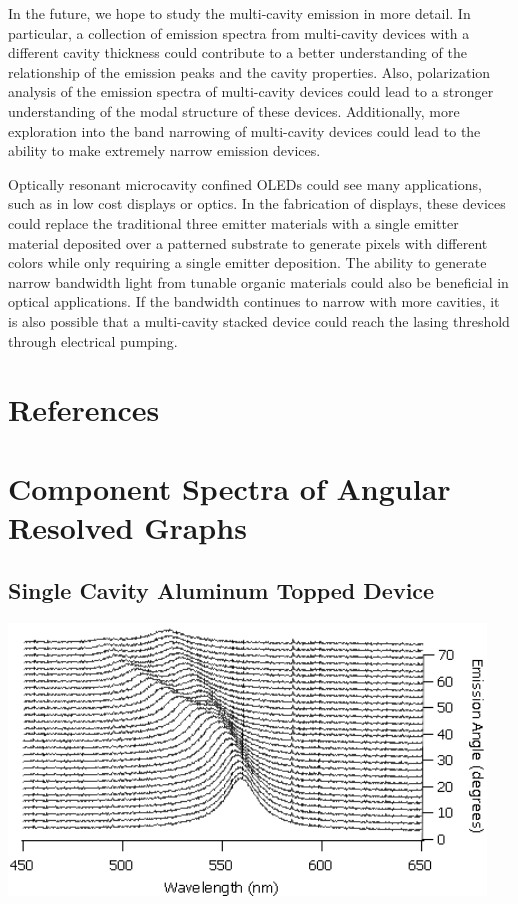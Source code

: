 \documentclass{report}
\begin{document}
    In the future, we hope to study the multi-cavity emission in more detail. In particular, a collection of emission spectra from multi-cavity devices with a different cavity thickness could contribute to a better understanding of the relationship of the emission peaks and the cavity properties. Also, polarization analysis of the emission spectra of multi-cavity devices could lead to a stronger understanding of the modal structure of these devices. Additionally, more exploration into the band narrowing of multi-cavity devices could lead to the ability to make extremely narrow emission devices.
    
    Optically resonant microcavity confined OLEDs could see many applications, such as in low cost displays or optics. In the fabrication of displays, these devices could replace the traditional three emitter materials with a single emitter material deposited over a patterned substrate to generate pixels with different colors while only requiring a single emitter deposition. The ability to generate narrow bandwidth light from tunable organic materials could also be beneficial in optical applications. If the bandwidth continues to narrow with more cavities, it is also possible that a multi-cavity stacked device could reach the lasing threshold through electrical pumping.\cite{Baldo2002,Bulovi1998} %
    
\chapter{References}
    \printbibliography[heading=none]

\appendix
\chapter{Component Spectra of Angular Resolved Graphs} \label{components}

    \section*{Single Cavity Aluminum Topped Device}
    \begin{center}
    \includegraphics[width=0.95\textwidth]{images/n1_al_top_waterfall.png}
    \end{center}
    
\end{document}
